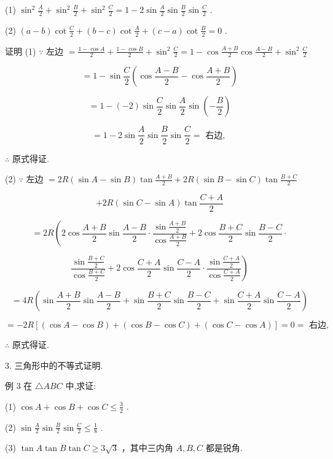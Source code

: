 \documentclass[10pt]{article}
\begin{document}
(1) \({\sin }^{2}\frac{A}{2} + {\sin }^{2}\frac{B}{2} + {\sin }^{2}\frac{C}{2} = 1 - 2\sin \frac{A}{2}\sin \frac{B}{2}\sin \frac{C}{2}\) .

(2) \(\left( {a - b}\right) \cot \frac{C}{2} + \left( {b - c}\right) \cot \frac{A}{2} + \left( {c - a}\right) \cot \frac{B}{2} = 0\) .

证明 (1) \(\because\) 左边 \(= \frac{1 - \cos A}{2} + \frac{1 - \cos B}{2} + {\sin }^{2}\frac{C}{2} = 1 - \cos \frac{A + B}{2}\cos \frac{A - B}{2} + {\sin }^{2}\frac{C}{2}\)

\[
= 1 - \sin \frac{C}{2}\left( {\cos \frac{A - B}{2} - \cos \frac{A + B}{2}}\right)
\]

\[
= 1 - \left( {-2}\right) \sin \frac{C}{2}\sin \frac{A}{2}\sin \left( {-\frac{B}{2}}\right)
\]

\[
= 1 - 2\sin \frac{A}{2}\sin \frac{B}{2}\sin \frac{C}{2} = \text{ 右边, }
\]

\(\therefore\) 原式得证.

(2) \(\because\) 左边 \(= {2R}\left( {\sin A - \sin B}\right) \tan \frac{A + B}{2} + {2R}\left( {\sin B - \sin C}\right) \tan \frac{B + C}{2}\)

\[
+ {2R}\left( {\sin C - \sin A}\right) \tan \frac{C + A}{2}
\]

\[
= {2R}\left( {2{\cos \frac{A + B}{2}}{\sin \frac{A - B}{2}} \cdot  \frac{\sin \frac{A + B}{2}}{\cos \frac{A + B}{2}} + 2{\cos \frac{B + C}{2}}{\sin \frac{B - C}{2}} \cdot  }\right.
\]

\[
\left. {\frac{\sin \frac{B + C}{2}}{\cos \frac{B + C}{2}} + 2\cos \frac{C + A}{2}\sin \frac{C - A}{2} \cdot  \frac{\sin \frac{C + A}{2}}{\cos \frac{C + A}{2}}}\right)
\]

\[
= {4R}\left( {\sin \frac{A + B}{2}\sin \frac{A - B}{2} + \sin \frac{B + C}{2}\sin \frac{B - C}{2} + \sin \frac{C + A}{2}\sin \frac{C - A}{2}}\right)
\]

\[
=  - {2R}\left\lbrack  {\left( {\cos A - \cos B}\right)  + \left( {\cos B - \cos C}\right)  + \left( {\cos C - \cos A}\right) }\right\rbrack   = 0 = \text{ 右边, }
\]

\(\therefore\) 原式得证.

3. 三角形中的不等式证明.

例 3 在 \(\bigtriangleup {ABC}\) 中,求证:

(1) \(\cos A + \cos B + \cos C \leq  \frac{3}{2}\) .

(2) \(\sin \frac{A}{2}\sin \frac{B}{2}\sin \frac{C}{2} \leq  \frac{1}{8}\) .

(3) \(\tan A\tan B\tan C \geq  3\sqrt{3}\) ，其中三内角 \(A,B,C\) 都是锐角.
\end{document}
